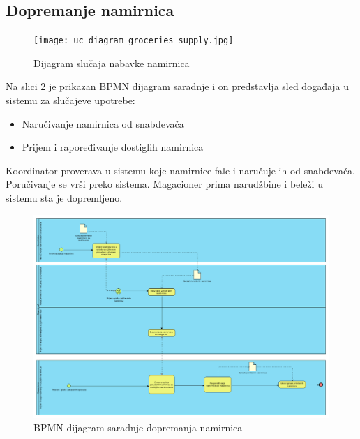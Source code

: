 \subsection{Dopremanje namirnica}
\begin{figure}[H]
\begin{center}
\texttt{[image: uc\_diagram\_groceries\_supply.jpg]}

    \caption{Dijagram slučaja nabavke namirnica}
    \end{center}
\label{fig:Uc_diagram_groceries_supply}
\end{figure}

Na slici \ref{fig:bpmnGroceryDelivery} je prikazan BPMN dijagram saradnje i on predstavlja sled događaja u sistemu za slučajeve upotrebe: 
\begin{itemize}
	\item{Naručivanje namirnica od snabdevača}
	\item{Prijem i rapoređivanje dostiglih namirnica}
\end{itemize}

Koordinator proverava u sistemu koje namirnice fale i naručuje ih od snabdevača.
Poručivanje se vrši preko sistema. Magacioner prima narudžbine i beleži u sistemu sta je dopremljeno.


\begin{figure}[H]
	\begin{center}
		\includegraphics[width=\textwidth]{Pictures/bpmn_grocery_delivery.png}
	\end{center}
    \caption{BPMN dijagram saradnje dopremanja namirnica}
\label{fig:bpmnGroceryDelivery}
\end{figure}




